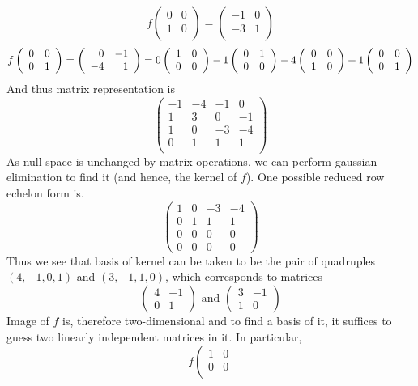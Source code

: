 \documentclass[12pt,fleqn]{article} %
\begin{document}
\begin{enumerate}
\[	\]
	\[f\left(\begin{array}{rr}
	0&0\\
	1&0\\
	\end{array}\right)
	=\left(\begin{array}{rr}
	-1&0\\
	-3&1\\
	\end{array}\right)
	\]
	\[f\left(\begin{array}{rr}
	0&0\\
	0&1\\
	\end{array}\right)
	=\left(\begin{array}{rr}
	0&-1\\
	-4&1\\
\end{array}\right)=0\left(\begin{array}{rr}1&0\\0&0\end{array}\right)-1\left(\begin{array}{rr}0&1\\0&0\end{array}\right)-4\left(\begin{array}{rr}0&0\\1&0\end{array}\right)+1\left(\begin{array}{rr}0&0\\0&1\end{array}\right)\]
And thus matrix representation is
\[\left(\begin{array}{rrrr}
-1&-4&-1&0\\
1&3&0&-1\\
1&0&-3&-4\\
0&1&1&1\\
\end{array}\right)
\]
As null-space is unchanged by matrix operations, we can perform gaussian elimination to find it (and hence, the kernel of $f$).
One possible reduced row echelon form is.
\[\left(\begin{array}{rrrr}1&0&-3&-4\\0&1&1&1\\0&0&0&0\\0&0&0&0\end{array}\right)\]
Thus we see that basis of kernel can be taken to be the pair of quadruples $(4,-1,0,1)$ and $(3,-1,1,0)$, which corresponds
to matrices
\[\left(\begin{array}{rr}4&-1\\0&1\end{array}\right)\mbox{ and }\left(\begin{array}{rr}3&-1\\1&0\end{array}\right)\]
Image of $f$ is, therefore two-dimensional and to find a basis of it, it suffices to guess two linearly independent matrices
in it. In particular,
	\[f\left(\begin{array}{rr}
	1&0\\
	0&0\\

\end{array}\]
\end{enumerate}
\end{document}
